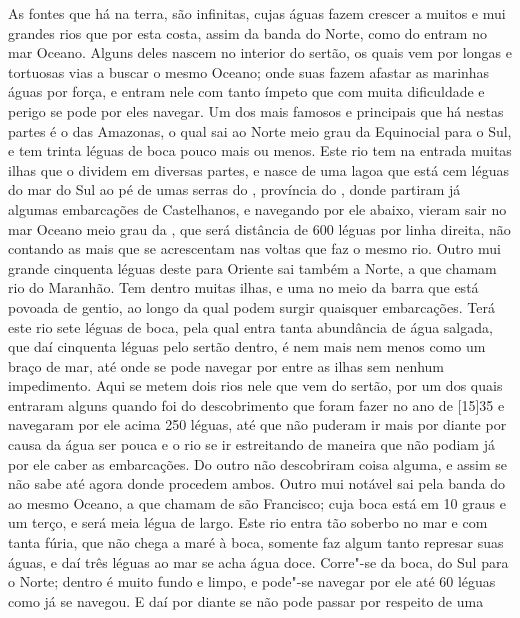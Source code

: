 As fontes que há na terra, são infinitas, cujas águas fazem crescer a
muitos e mui grandes rios que por esta costa, assim da banda do Norte,
como do  entram no mar Oceano. Alguns deles nascem no interior		
do sertão, os quais vem por longas e tortuosas vias a buscar o mesmo
Oceano; onde suas  fazem afastar as marinhas águas por força,
e entram nele com tanto ímpeto que com muita dificuldade e perigo se
pode por eles navegar. Um dos mais famosos e principais que há nestas
partes é o das Amazonas, o qual sai ao Norte meio grau da Equinocial			%
para o Sul, e tem trinta léguas de boca pouco mais ou menos. Este rio
tem na entrada muitas ilhas que o dividem em diversas partes, e nasce
de uma lagoa que está cem léguas do mar do Sul ao pé de umas serras do
, província do , donde partiram já algumas embarcações de
Castelhanos, e navegando por ele abaixo, vieram sair no mar Oceano
meio grau da , que  será distância de 600 léguas por linha
direita, não contando as mais que se acrescentam nas voltas que faz o
mesmo rio. Outro mui grande cinquenta léguas deste para Oriente sai
também a Norte, a que chamam rio do Maranhão. Tem dentro muitas ilhas,			%
e uma no meio da barra que está  povoada de gentio, ao longo da qual			%
podem surgir quaisquer embarcações. Terá este rio sete léguas de boca,
pela qual entra tanta abundância de água salgada, que daí cinquenta
léguas pelo sertão dentro, é nem mais nem menos como um braço de mar,
até onde se pode navegar por entre as ilhas sem nenhum impedimento.
Aqui se metem dois rios nele que vem do sertão, por um dos quais entraram alguns  quando foi do
descobrimento que foram fazer no ano de [15]35 e navegaram por ele acima
250 léguas, até que não puderam ir mais por diante por
causa da água ser pouca e o rio se ir estreitando de maneira que não
podiam já por ele caber as embarcações. Do outro não descobriram coisa
alguma, e assim se não sabe até agora donde procedem ambos. Outro mui
notável sai pela banda do  ao mesmo Oceano, a que chamam de são		%
Francisco; cuja boca está em 10 graus e um terço, e será meia légua de
largo. Este rio entra tão soberbo no mar e com tanta fúria, que não
chega a maré à boca, somente faz algum tanto represar suas águas, e daí três léguas ao mar se acha água
doce. Corre"-se da boca, do Sul para o Norte; dentro é muito fundo e
limpo, e pode"-se navegar por ele até 60 léguas como já se
navegou. E daí por diante se não pode passar por respeito de uma
